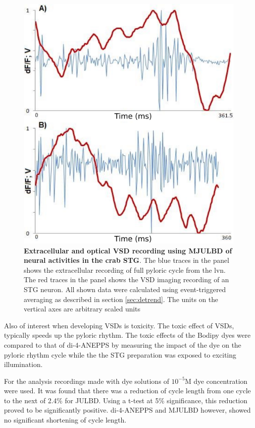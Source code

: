 \begin{figure}[H]
	\begin{center}
		\includegraphics[width=12cm]{graphics/mjulbdrecording.png}
		\caption[Extracellular and optical \ac{VSD} recording using MJULBD of neural activities in the crab \ac{STG}]{\textbf{Extracellular and optical \ac{VSD} recording using MJULBD of neural activities in the crab \ac{STG}}. The blue traces in the panel shows the extracellular recording of full pyloric cycle from the \ac{lvn}. The red traces in the panel shows the \ac{VSD} imaging recording of an \ac{STG} neuron. All shown data were calculated using event-triggered averaging as described in section \ref{sec:detrend}. The units on the vertical axes are arbitrary scaled units}
		\label{fig:mjulbdrecording}
	\end{center}
\end{figure}

Also of interest when developing \acp{VSD} is toxicity. The toxic effect of \acp{VSD}, typically speeds up the pyloric rhythm. The toxic effects of the Bodipy dyes were compared to that of di-4-ANEPPS by measuring the impact of the dye on the pyloric rhythm cycle while the the \ac{STG} preparation was exposed to exciting illumination.

For the analysis recordings made with dye solutions of $10^{-5}$M dye concentration were used. It was found that there was a reduction of cycle length from one cycle to the next of 2.4\% for JULBD. Using a t-test at 5\% significance, this reduction proved to be significantly positive. di-4-ANEPPS and MJULBD however, showed no significant shortening of cycle length.

